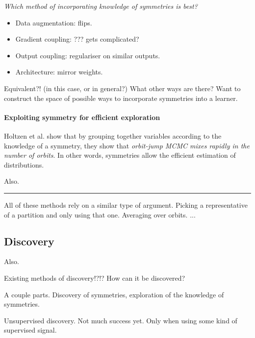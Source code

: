 \begin{displayquote}
\textit{Which method of incorporating knowledge of symmetries is best?}
\end{displayquote}

\begin{itemize}
\tightlist
  \item Data augmentation: flips.
  \item Gradient coupling: ??? gets complicated?
  \item Output coupling: regulariser on similar outputs.
  \item Architecture: mirror weights.
\end{itemize}

Equivalent?! (in this case, or in general?)
What other ways are there? Want to construct the space of possible ways to incorporate symmetries into a learner.


\paragraph{Exploiting symmetry for efficient exploration}

Holtzen et al. \cite{Holtzen2019} show that by grouping together variables according to
the knowledge of a symmetry, they show that \textit{orbit-jump MCMC mixes rapidly in the number of orbits}.
In other words, symmetries allow the efficient estimation of distributions.

Also. \cite{Campbell2019}

\begin{center}\rule{0.5\linewidth}{\linethickness}\end{center}

All of these methods rely on a similar type of argument. Picking a representative
of a partition and only using that one. Averaging over orbits. ...


\subsection{Discovery}

Also.

Existing methods of discovery!?!?
 How can it be discovered?

 A couple parts. Discovery of symmetries, exploration of the knowledge of symmetries.

 Unsupervised discovery. Not much success yet. Only when using some kind of supervised signal.

